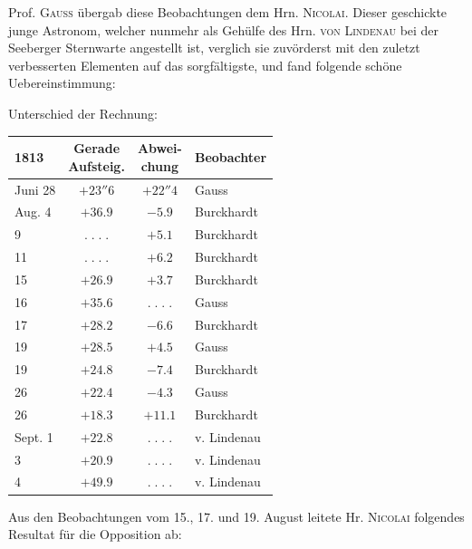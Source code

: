\par\indent Prof. \textsc{Gauss} übergab diese Beobachtungen dem Hrn. \textsc{Nicolai}. Dieser
geschickte junge Astronom, welcher nunmehr als Gehülfe des Hrn. \textsc{von Lindenau} bei der
Seeberger Sternwarte angestellt ist, verglich sie zuvörderst mit den zuletzt verbesserten
Elementen auf das sorgfältigste, und fand folgende schöne Uebereinstimmung:

\begin{center}Unterschied der Rechnung:\end{center}
\begin{center}\fontsize{10}{12}\selectfont\setlength{\tabcolsep}{7pt}\renewcommand{\arraystretch}{1.15}\begin{tabular}{l|c|c|l}
1813 & \shortstack{Gerade\\Aufsteig.} & \shortstack{Abwei-\\chung} & Beobachter\\\hline
Juni 28 & $+23''6$ & $+22''4$ & Gauss\\
Aug. 4 & $+36.9$ & $-5.9$ & Burckhardt\\
9 & $.\;.\;.\;.$ & $+5.1$ & Burckhardt\\
11 & $.\;.\;.\;.$ & $+6.2$ & Burckhardt\\
15 & $+26.9$ & $+3.7$ & Burckhardt\\
16 & $+35.6$ & $.\;.\;.\;.$ & Gauss\\
17 & $+28.2$ & $-6.6$ & Burckhardt\\
19 & $+28.5$ & $+4.5$ & Gauss\\
19 & $+24.8$ & $-7.4$ & Burckhardt\\
26 & $+22.4$ & $-4.3$ & Gauss\\
26 & $+18.3$ & $+11.1$ & Burckhardt\\
Sept. 1 & $+22.8$ & $.\;.\;.\;.$ & v. Lindenau\\
3 & $+20.9$ & $.\;.\;.\;.$ & v. Lindenau\\
4 & $+49.9$ & $.\;.\;.\;.$ & v. Lindenau\\
\end{tabular}\end{center}

\par\indent Aus den Beobachtungen vom 15., 17. und 19. August leitete Hr. \textsc{Nicolai} folgendes
Resultat für die Opposition ab:

